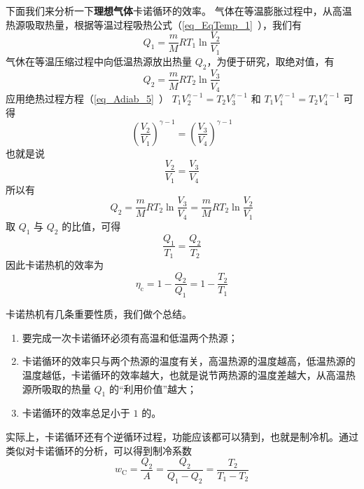 下面我们来分析一下\textbf{理想气体}卡诺循环的效率。 气体在等温膨胀过程中，从高温热源吸取热量，根据等温过程吸热公式（\autoref{eq_EqTemp_1}~），我们有
\begin{equation}\label{eq_Carnot_1}
Q_{1}=\frac{m}{M} R T_{1} \ln \frac{V_{2}}{V_{1}}
\end{equation}
气休在等温压缩过程中向低温热源放出热量 $Q_2$，为便于研究，取绝对值，有
\begin{equation}\label{eq_Carnot_2}
Q_{2}=\frac{m}{M} R T_{2} \ln \frac{V_{3}}{V_{4}}
\end{equation}
应用绝热过程方程（\autoref{eq_Adiab_5}~） $T_{1} V_{2}^{\gamma-1}=T_{2} V_{3}^{\gamma-1}$ 和 $T_{1} V_{1}^{\gamma-1}=T_{2} V_{4}^{\gamma-1}$ 可得
\begin{equation}
\left(\frac{V_{2}}{V_{1}}\right)^{\gamma-1}=\left(\frac{V_{3}}{V_{4}}\right)^{\gamma-1}
\end{equation}
也就是说
\begin{equation}\label{eq_Carnot_3}
\frac{V_{2}}{V_{1}}=\frac{V_{3}}{V_{4}}
\end{equation}
所以有
\begin{equation}
Q_{2}=\frac{m}{M} R T_{2} \ln \frac{V_{3}}{V_{4}}=\frac{m}{M} R T_{2} \ln \frac{V_{2}}{V_{1}}
\end{equation}
取 $Q_1$ 与 $Q_2$ 的比值，可得
\begin{equation}\label{eq_Carnot_4}
\frac{Q_{1}}{T_{1}}=\frac{Q_{2}}{T_{2}}
\end{equation}
因此卡诺热机的效率为
\begin{equation}
\eta_{\mathrm{c}}=1-\frac{Q_{2}}{Q_{1}}=1-\frac{T_{2}}{T_{1}}
\end{equation}

卡诺热机有几条重要性质，我们做个总结。

\begin{enumerate}
\item 要完成一次卡诺循环必须有高温和低温两个热源；
\item 卡诺循环的效率只与两个热源的温度有关，高温热源的温度越高，低温热源的温度越低，卡诺循环的效率越大，也就是说节两热源的温度差越大，从高温热源所吸取的热量 $Q_1$ 的“利用价值”越大；
\item 卡诺循环的效率总足小于 $1 $ 的。
\end{enumerate}

实际上，卡诺循环还有个逆循环过程，功能应该都可以猜到，也就是制冷机。通过类似对卡诺循环的分析，可以得到制冷系数
\begin{equation}
w_{\mathrm{C}}=\frac{Q_{2}}{A}=\frac{Q_{2}}{Q_{1}-Q_{2}}=\frac{T_{2}}{T_{1}-T_{2}}
\end{equation}

